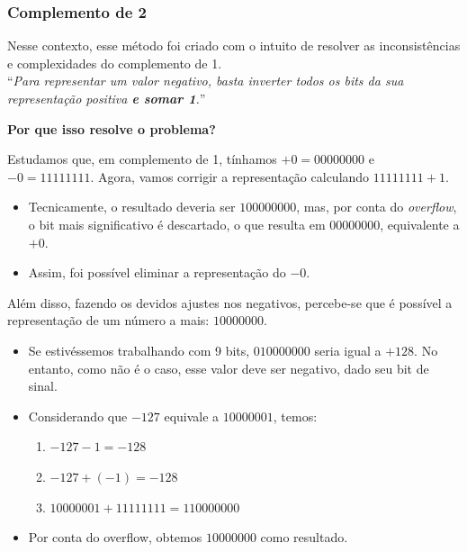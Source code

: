\documentclass[12pt]{article}
\begin{document}
\subsubsection{Complemento de 2}
Nesse contexto, esse método foi criado com o intuito de resolver as inconsistências e complexidades do complemento de 1.
\vspace{0.2cm} \\
“\textit{Para representar um valor negativo, basta inverter todos os bits da sua representação positiva \textbf{e somar 1}.}”

\vspace{0.2cm}
\noindent
\textbf{Por que isso resolve o problema?} 

\noindent
Estudamos que, em complemento de 1, tínhamos $+0 = 00000000$ e $-0 = 11111111$.
Agora, vamos corrigir a representação calculando $11111111 + 1$.

\begin{itemize}
    \item [""] Tecnicamente, o resultado deveria ser $100000000$, mas, por conta do \textit{overflow}, o bit mais significativo é descartado, o que resulta em $00000000$, equivalente a $+0$.
    \item [""] Assim, foi possível eliminar a representação do $-0$.
\end{itemize}

\newpage
\noindent
Além disso, fazendo os devidos ajustes nos negativos, percebe-se que é possível a representação de um número a mais: $10000000$.

\begin{itemize}
    \item [""] Se estivéssemos trabalhando com 9 bits, $010000000$ seria igual a $+128$. No entanto, como não é o caso, esse valor deve ser negativo, dado seu bit de sinal.
    \item [""] Considerando que $-127$ equivale a $10000001$, temos:

    \begin{enumerate}
        \item [""] $-127 - 1 = -128$
        \item [""] $-127 + (-1) = -128$
        \item [""] $10000001 + 11111111 = 110000000$
    \end{enumerate}

    \item [""] Por conta do overflow, obtemos $10000000$ como resultado.
\end{itemize}
\end{document}

